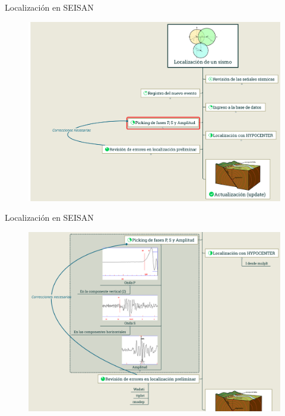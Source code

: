 \documentclass[11pt]{beamer}
\begin{document}
\begin{frame}{Localización en SEISAN}
\begin{figure}
\includegraphics[scale=0.15]{localizacion_1_4.png}
\end{figure}
\end{frame}

\begin{frame}{Localización en SEISAN}
\begin{figure}
\includegraphics[scale=0.15]{localizacion_5.png}
\end{figure}
\end{frame}
\end{document}
